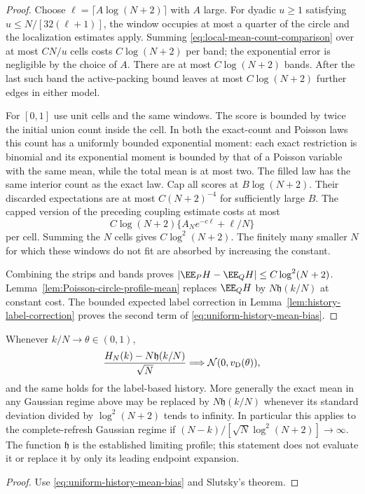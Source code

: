 \documentclass[11pt,letterpaper]{article}
\begin{document}
\begin{proof}
Choose $\ell=\lceil A\log(N+2)\rceil$ with $A$ large.
For dyadic $u\ge1$ satisfying $u\le N/[32(\ell+1)]$,
the window occupies at most a quarter of the circle and
the localization estimates apply. Summing
\eqref{eq:local-mean-count-comparison} over at most $CN/u$
cells costs $C\log(N+2)$ per band; the exponential error
is negligible by the choice of $A$.
There are at most $C\log(N+2)$ bands.
After the last such band the active-packing bound leaves
at most $C\log(N+2)$ further edges in either model.

For $[0,1]$ use unit cells and the same windows.
The score is bounded by twice the initial union count
inside the cell. In both the exact-count and Poisson laws
this count has a uniformly bounded exponential moment:
each exact restriction is binomial and its exponential
moment is bounded by that of a Poisson variable with
the same mean, while the total mean is at most two.
The filled law has the same interior count as the exact law.
Cap all scores at $B\log(N+2)$. Their discarded expectations
are at most $C(N+2)^{-4}$ for sufficiently large $B$.
The capped version of the preceding coupling estimate costs
at most
\[
 C\log(N+2)\{A_Ne^{-c\ell}+\ell/N\}
\]
per cell. Summing the $N$ cells gives $C\log^2(N+2)$.
The finitely many smaller $N$ for which these windows do
not fit are absorbed by increasing the constant.

Combining the strips and bands proves
$|\EE_P H-\EE_Q H|\le C\log^2(N+2)$.
Lemma~\ref{lem:Poisson-circle-profile-mean} replaces
$\EE_QH$ by $N\mathfrak h(k/N)$ at constant cost.
The bounded expected label correction in
Lemma~\ref{lem:history-label-correction} proves the second
term of \eqref{eq:uniform-history-mean-bias}.
\end{proof}

\begin{corollary}
\label{cor:profile-centered-history-CLT}
Whenever $k/N\to\theta\in(0,1)$,
\[
 \frac{H_N(k)-N\mathfrak h(k/N)}{\sqrt N}
        \Longrightarrow\mathcal N(0,v_{\rm D}(\theta)),
\]
and the same holds for the label-based history.
More generally the exact mean in any Gaussian regime above
may be replaced by $N\mathfrak h(k/N)$ whenever its standard
deviation divided by $\log^2(N+2)$ tends to infinity.
In particular this applies to the complete-refresh Gaussian
regime if $(N-k)/[\sqrt N\log^2(N+2)]\to\infty$.
The function $\mathfrak h$ is the established limiting profile;
this statement does not evaluate it or replace it by only
its leading endpoint expansion.
\end{corollary}
\begin{proof}
Use \eqref{eq:uniform-history-mean-bias} and Slutsky's theorem.
\end{proof}
\end{document}
